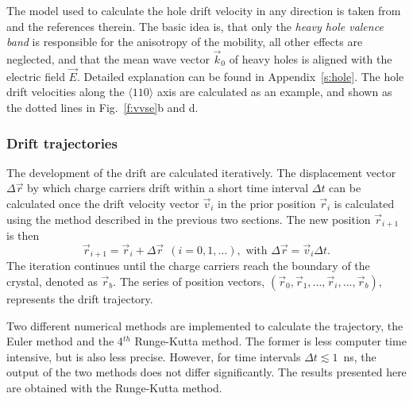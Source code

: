 \documentclass[epj]{svjour}
\begin{document}
The model used to calculate the hole drift velocity in any direction
is taken from \cite{bart} and the references therein. The basic idea
is, that only the \emph{heavy hole valence band} \cite{heavy} is
responsible for the anisotropy of the mobility, all other effects are
neglected, and that the mean wave vector $\vec{k}_{0}$ of heavy holes
is aligned with the electric field $\vec{E}$. Detailed explanation can
be found in Appendix~\ref{s:hole}. The hole drift velocities along the
$\langle 110 \rangle$ axis are calculated as an example, and shown as
the dotted lines in Fig.~\ref{f:vvse}b and d.

\subsubsection{Drift trajectories} 
\label{s:trj} 
The development of the drift are calculated iteratively. The
displacement vector $\Delta \vec{r}$ by which charge carriers drift
within a short time interval $\Delta t$ can be calculated once the
drift velocity vector $\vec{v}_{i}$ in the prior position
$\vec{r}_{i}$ is calculated using the method described in the previous
two sections.  The new position $\vec{r}_{i+1}$ is then
\begin{equation} 
\label{e:pos} 
\vec{r}_{i+1} = \vec{r}_{i} + \Delta \vec{r} \ \ 
(i=0,1,...), \mbox{ with } 
\Delta \vec{r} = \vec{v}_{i} \Delta t. 
\end{equation} 
The iteration continues until the charge carriers reach the boundary
of the crystal, denoted as $\vec{r}_{b}$. The series of position
vectors, $(\vec{r}_{0}, \vec{r}_{1}, ..., \vec{r}_{i}, ...,
\vec{r}_{b})$, represents the drift trajectory.
 
Two different numerical methods are implemented to calculate the
trajectory, the Euler method and the 4$^{th}$ Runge-Kutta method. The
former is less computer time intensive, but is also less precise.
However, for time intervals $\Delta t \lesssim 1$~ns, the output of
the two methods does not differ significantly. The results presented
here are obtained with the Runge-Kutta method.
 
\end{document}
